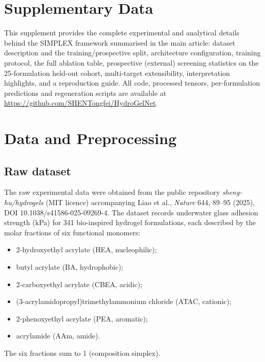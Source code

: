 \documentclass[utf8]{frontiers_suppmat}
\begin{document}
\onecolumn
{}

\title[Supplementary Material]{{}}

\maketitle

\section{Supplementary Data}

This supplement provides the complete experimental and analytical details
behind the SIMPLEX framework summarised in the main article: dataset
description and the training/prospective split, architecture configuration,
training protocol, the full ablation table, prospective (external) screening
statistics on the 25-formulation held-out cohort, multi-target extensibility,
interpretation highlights, and a reproduction guide. All code, processed
tensors, per-formulation predictions and regeneration scripts are available
at \url{https://github.com/SHENTongfei/HydroGelNet}.

\section{Data and Preprocessing}

\subsection{Raw dataset}
The raw experimental data were obtained from the public repository
\emph{sheng-hu/hydrogels} (MIT licence) accompanying Liao et al.,
\textit{Nature} 644, 89--95 (2025), DOI 10.1038/s41586-025-09269-4. The
dataset records underwater glass adhesion strength (kPa) for 341 bio-inspired
hydrogel formulations, each described by the molar fractions of six
functional monomers:
\begin{itemize}
\item 2-hydroxyethyl acrylate (HEA, nucleophilic);
\item butyl acrylate (BA, hydrophobic);
\item 2-carboxyethyl acrylate (CBEA, acidic);
\item (3-acrylamidopropyl)trimethylammonium chloride (ATAC, cationic);
\item 2-phenoxyethyl acrylate (PEA, aromatic);
\item acrylamide (AAm, amide).
\end{itemize}
The six fractions sum to 1 (composition simplex).
\end{document}
